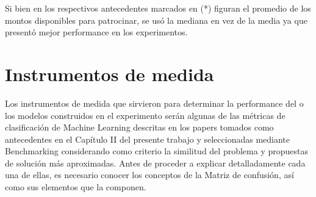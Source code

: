 Si bien en los respectivos antecedentes marcados en (*) figuran el promedio de los montos disponibles para patrocinar, se usó la mediana en vez de la media ya que presentó mejor performance en los experimentos.

\section{Instrumentos de medida}
Los instrumentos de medida que sirvieron para determinar la performance del o los modelos construidos en el experimento serán algunas de las métricas de clasificación de Machine Learning descritas en los papers tomados como antecedentes en el Capítulo II del presente trabajo y seleccionadas mediante Benchmarking considerando como criterio la similitud del problema y propuestas de solución más aproximadas. Antes de proceder a explicar detalladamente cada una de ellas, es necesario conocer los conceptos de la Matriz de confusión, así como sus elementos que la componen.

